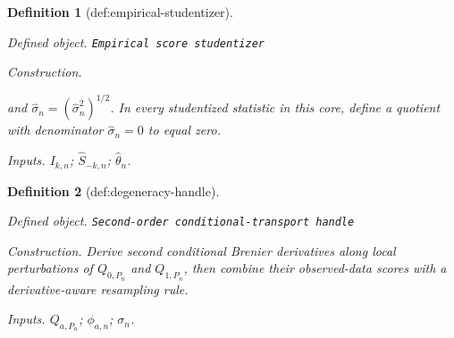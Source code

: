 \documentclass{article}
\newtheorem{definition}{Definition}
\begin{document}
\begin{definition}[def:empirical-studentizer]\label{def:empirical-studentizer}
\par\smallskip\noindent\emph{Defined object.} \texttt{Empirical score studentizer}
\par\smallskip\noindent\emph{Construction.} \par\noindent {}\par\noindent and \(\widehat\sigma_n=(\widehat\sigma_n^2)^{1/2}\). In every studentized statistic in this core, define a quotient with denominator \(\widehat\sigma_n=0\) to equal zero.
\par\smallskip\noindent\emph{Inputs.} \(I_{k,n}\); \(\widehat S_{-k,n}\); \(\widehat\theta_n\).
\end{definition}

\begin{definition}[def:degeneracy-handle]\label{def:degeneracy-handle}
\par\smallskip\noindent\emph{Defined object.} \texttt{Second-\allowbreak{}order conditional-\allowbreak{}transport handle}
\par\smallskip\noindent\emph{Construction.} Derive second conditional Brenier derivatives along local perturbations of \(Q_{0,P_n}\) and \(Q_{1,P_n}\), then combine their observed-data scores with a derivative-aware resampling rule.
\par\smallskip\noindent\emph{Inputs.} \(Q_{a,P_n}\); \(\phi_{a,n}\); \(\sigma_n\).
\end{definition}
\end{document}
